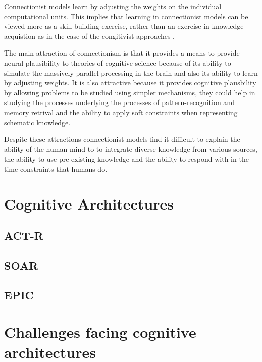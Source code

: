      Connectionist models learn by adjusting the weights on the
     individual computational units. This implies that learning in
     connectionist models can be viewed more as a skill building
     exercise, rather than an exercise in knowledge acquistion as in
     the case of the congitivist approaches
     \cite{DBLP:journals/tec/VernonMS07}.
     
     The main attraction of connectionism is that it provides a means
     to provide neural plausibility\cite{103009} to theories of
     cognitive science because of its ability to simulate the
     massively parallel processing in the brain and also its ability
     to learn by adjusting weights. It is also attractive because it
     provides cognitive plausbility by allowing problems to be studied
     using simpler mechanisms, they could help in studying the
     processes underlying the processes of pattern-recognition and
     memory retrival and the ability to apply soft constraints when
     representing schematic knowledge.

     Despite these attractions connectionist models find it difficult
     to explain the ability of the human mind to to integrate diverse
     knowledge from various sources, the ability to use pre-existing
     knowledge and the ability to respond with in the time constraints
     that humans do.

     
\section{Cognitive Architectures}
\subsection{ACT-R}
\subsection{SOAR}
\subsection{EPIC}
\section{Challenges facing cognitive architectures}
